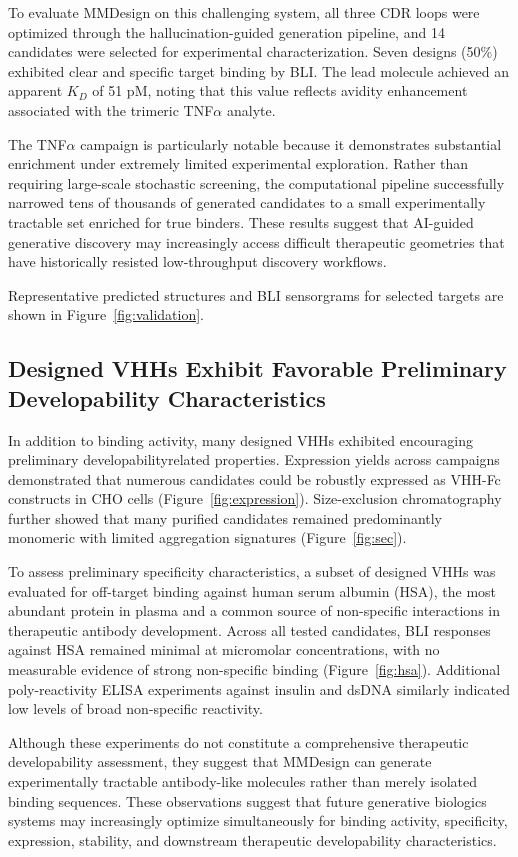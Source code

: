 \documentclass[11pt]{article}
\begin{document}
To evaluate MMDesign on this challenging system, all three CDR loops were optimized through
the hallucination-guided generation pipeline, and 14 candidates were selected for experimental
characterization. Seven designs (50\%) exhibited clear and specific target binding by BLI. The lead
molecule achieved an apparent $K_D$ of 51 pM, noting that this value reflects avidity enhancement
associated with the trimeric TNF$\alpha$ analyte.

The TNF$\alpha$ campaign is particularly notable because it demonstrates substantial enrichment
under extremely limited experimental exploration. Rather than requiring large-scale stochastic
screening, the computational pipeline successfully narrowed tens of thousands of generated candidates to a small experimentally tractable set enriched for true binders. These results suggest that
AI-guided generative discovery may increasingly access difficult therapeutic geometries that have
historically resisted low-throughput discovery workflows.

Representative predicted structures and BLI sensorgrams for selected targets are shown in
Figure~\ref{fig:validation}.

\subsection{Designed VHHs Exhibit Favorable Preliminary Developability Characteristics}
In addition to binding activity, many designed VHHs exhibited encouraging preliminary developabilityrelated properties. Expression yields across campaigns demonstrated that numerous candidates
could be robustly expressed as VHH-Fc constructs in CHO cells (Figure~\ref{fig:expression}). Size-exclusion chromatography further showed that many purified candidates remained predominantly monomeric
with limited aggregation signatures (Figure~\ref{fig:sec}).

To assess preliminary specificity characteristics, a subset of designed VHHs was evaluated for
off-target binding against human serum albumin (HSA), the most abundant protein in plasma and
a common source of non-specific interactions in therapeutic antibody development. Across all
tested candidates, BLI responses against HSA remained minimal at micromolar concentrations,
with no measurable evidence of strong non-specific binding (Figure~\ref{fig:hsa}). Additional poly-reactivity
ELISA experiments against insulin and dsDNA similarly indicated low levels of broad non-specific
reactivity.

Although these experiments do not constitute a comprehensive therapeutic developability
assessment, they suggest that MMDesign can generate experimentally tractable antibody-like
molecules rather than merely isolated binding sequences. These observations suggest that future generative biologics systems may increasingly optimize simultaneously for binding activity,
specificity, expression, stability, and downstream therapeutic developability characteristics.
\end{document}
